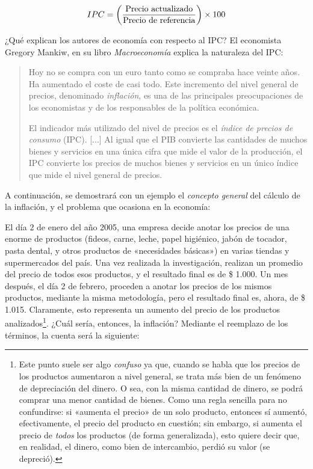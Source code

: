 \documentclass[12pt,a4paper,twoside]{book}
\begin{document}
\begin{equation}
IPC = \left( \dfrac{\text{Precio actualizado}}{\text{Precio de referencia}} \right) \times 100 \\
\end{equation}

¿Qué explican los autores de economía con respecto al IPC? El economista Gregory Mankiw, en su libro \textit{Macroeconomía} explica la naturaleza del IPC:

\begin{quotation}
Hoy no se compra con un euro tanto como se compraba hace veinte años. Ha aumentado el coste de casi todo. Este incremento del nivel general de precios, denominado \textit{inflación}, es una de las principales preocupaciones de los economistas y de los responsables de la política económica.

El indicador más utilizado del nivel de precios es el \textit{índice de precios de consumo} (IPC). [...] Al igual que el PIB convierte las cantidades de muchos bienes y servicios en una única cifra que mide el valor de la producción, el IPC convierte los precios de muchos bienes y servicios en un único índice que mide el nivel general de precios. \cite[págs. 84-85]{mankiw}
\end{quotation}

A continuación, se demostrará con un ejemplo el \textit{concepto general} del cálculo de la inflación, y el problema que ocasiona en la economía:

El día 2 de enero del año 2005, una empresa decide anotar los precios de una enorme de productos (fideos, carne, leche, papel higiénico, jabón de tocador, pasta dental, y otros productos de «necesidades básicas») en varias tiendas y supermercados del país. Una vez realizada la investigación, realizan un promedio del precio de todos esos productos, y el resultado final es de \$ 1.000. Un mes después, el día 2 de febrero, proceden a anotar los precios de los mismos productos, mediante la misma metodología, pero el resultado final es, ahora, de \$ 1.015. Claramente, esto representa un aumento del precio de los productos analizados\footnote{Este punto suele ser algo \textit{confuso} ya que, cuando se habla que los precios de los productos aumentaron a nivel general, se trata más bien de un fenómeno de depreciación del dinero. O sea, con la misma cantidad de dinero, se podrá comprar una menor cantidad de bienes. Como una regla sencilla para no confundirse: si «aumenta el precio» de un solo producto, entonces sí aumentó, efectivamente, el precio del producto en cuestión; sin embargo, si aumenta el precio de \textit{todos} los productos (de forma generalizada), esto quiere decir que, en realidad, el dinero, como bien de intercambio, perdió su valor (se depreció).}. ¿Cuál sería, entonces, la inflación? Mediante el reemplazo de los términos, la cuenta será la siguiente:
\end{document}
